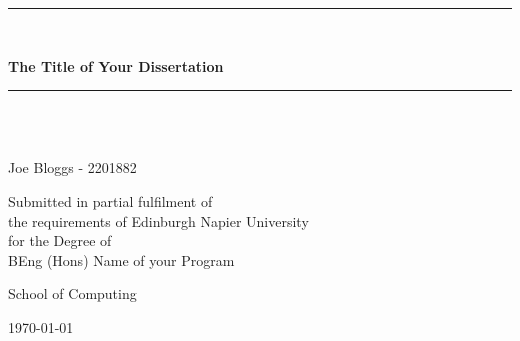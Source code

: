 \newcommand{\HRule}{\rule{\linewidth}{0.5mm}}

\begin{titlepage}
	\begin{center}

	\HRule \\[0.4cm]
    	{\Large \bfseries The Title of Your Dissertation\par}
	\vspace{0.2cm}
	\HRule \\[1.5cm]

	
    	\vspace{3cm}
	\begin{minipage}{0.4\textwidth}
	\begin{center} \large
        \emph{}\\
        	Joe Bloggs - 2201882
				
   	 \end{center}
    	\end{minipage}
	
	\vspace{2cm}
    	\begin{minipage}{1\textwidth}
    	\begin{center} \large
        
		Submitted in partial fulfilment of \\
		the requirements of Edinburgh Napier University \\
		for the Degree of \\
        	BEng (Hons) Name of your Program
    	\end{center}
    	\end{minipage}

    	\vfill

	\begin{minipage}{1\textwidth}
    	\begin{center} \large
		School of Computing
    	\end{center}
    	\end{minipage}
	
	\vspace{1cm}
    	{\large \today}


	\end{center}
\end{titlepage}
